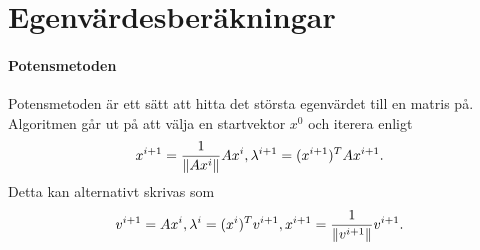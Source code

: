 \section{Egenvärdesberäkningar}

\paragraph{Potensmetoden}
Potensmetoden är ett sätt att hitta det största egenvärdet till en matris på. Algoritmen går ut på att välja en startvektor $x^{0}$ och iterera enligt
\begin{align*}
	x^{i + 1} = \frac{1}{\norm{Ax^{i}}}Ax^{i}, \lambda^{i + 1} = (x^{i + 1})^{T}Ax^{i + 1}.
\end{align*}
Detta kan alternativt skrivas som
\begin{align*}
	v^{i + 1} = Ax^{i}, \lambda^{i} = (x^{i})^{T}v^{i + 1}, x^{i + 1} = \frac{1}{\norm{v^{i + 1}}}v^{i + 1}.
\end{align*}